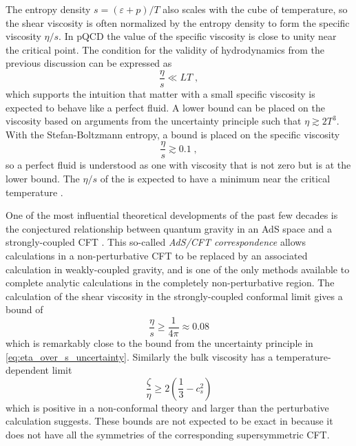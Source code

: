 The entropy density $s = (\varepsilon + p)/T$ also scales with the cube of temperature, so the shear viscosity is often normalized by the entropy density to form the specific viscosity $\eta/s$.
In \ac{pQCD} the value of the specific viscosity is close to unity near the critical point.
The condition for the validity of hydrodynamics from the previous discussion can be expressed as
\begin{equation}
  \frac{\eta}{s} \ll LT \;,
\end{equation}
which supports the intuition that matter with a small specific viscosity is expected to behave like a perfect fluid.
A lower bound can be placed on the viscosity based on arguments from the uncertainty principle \cite{Danielewicz:1984ww} such that $\eta \gtrsim 2T^3$.
With the Stefan-Boltzmann entropy, a bound is placed on the specific viscosity
\begin{equation}
  \label{eq:eta_over_s_uncertainty}
  \frac{\eta}{s} \gtrsim 0.1 \; ,
\end{equation}
so a perfect fluid is understood as one with viscosity that is not zero but is at the lower bound.
The $\eta/s$ of the \qgp is expected to have a minimum near the critical temperature \cite{Csernai:2006zz}.

One of the most influential theoretical developments of the past few decades is the conjectured relationship between quantum gravity in an \ac{AdS} space and a strongly-coupled \ac{CFT} \cite{Maldacena:1997re}.
This so-called \emph{\ac{AdS}/\ac{CFT} correspondence} allows calculations in a non-perturbative \ac{CFT} to be replaced by an associated calculation in weakly-coupled gravity, and is one of the only methods available to complete analytic calculations in the completely non-perturbative region.
The calculation of the shear viscosity in the strongly-coupled conformal limit gives a bound of \cite{Kovtun:2004de}
\begin{equation}
  \frac{\eta}{s} \geq \frac{1}{4\pi} \approx 0.08
\end{equation}
which is remarkably close to the bound from the uncertainty principle in \cref{eq:eta_over_s_uncertainty}.
Similarly the bulk viscosity has a temperature-dependent limit \cite{Buchel:2007mf}
\begin{equation}
  \frac{\zeta}{\eta} \geq 2\left(\frac{1}{3} - c_s^2 \right)
\end{equation}
which is positive in a non-conformal theory and larger than the perturbative calculation suggests. %
These bounds are not expected to be exact in \qcd because it does not have all the symmetries of the corresponding supersymmetric \ac{CFT}.

